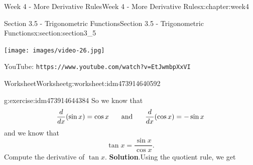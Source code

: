 \documentclass[oneside,10pt,]{book}
\newcommand{\blocktitlefont}{\relax}
\newcommand{\mono}[1]{\texttt{#1}}
\numberwithin{equation}{section}
\newlength{\qrsize}
\newlength{\previewwidth}
\begin{document}
\begin{chapterptx}{Week 4 - More Derivative Rules}{}{Week 4 - More Derivative Rules}{}{}{x:chapter:week4}
%
%
\typeout{************************************************}
\typeout{************************************************}
%
\begin{sectionptx}{Section 3.5 - Trigonometric Functions}{}{Section 3.5 - Trigonometric Functions}{}{}{x:section:section3_5}
\setlength{\qrsize}{9em}
\setlength{\previewwidth}{\linewidth}
\addtolength{\previewwidth}{-\qrsize}
\begin{tcbraster}[raster columns=2, raster column skip=1pt, raster halign=center, raster force size=false, raster left skip=0pt, raster right skip=0pt]%
\begin{tcolorbox}[previewstyle, width=\previewwidth]%
\texttt{[image: images/video-26.jpg]}%
\end{tcolorbox}%
\begin{tcolorbox}[qrstyle]%
{\hypersetup{urlcolor=black}}%
\end{tcolorbox}%
\begin{tcolorbox}[captionstyle]%
\small YouTube: \mono{https://www.youtube.com/watch?v=EtJwmbpXxVI}\end{tcolorbox}%
\end{tcbraster}%
%
%
\typeout{************************************************}
\typeout{************************************************}
%
\begin{worksheet-subsection}{Worksheet}{}{Worksheet}{}{}{g:worksheet:idm473914640592}
\begin{divisionexercise}{1}{}{}{g:exercise:idm473914644384}%
So we know that%
\begin{equation*}
\frac{d}{dx} ( \sin x ) = \cos x \hspace{.2in} \text{ and } \hspace{.2in} \frac{d}{dx} (\cos x) = - \sin x 
\end{equation*}
and we know that%
\begin{equation*}
\tan x = \frac{\sin x}{\cos x} . 
\end{equation*}
Compute the derivative of \(\tan x\).%
\textbf{\blocktitlefont Solution}.\hypertarget{g:solution:idm473914644064}{}\quad{}Using the quotient rule, we get%
\begin{equation*}

\end{equation*}
\end{divisionexercise}
\end{worksheet-subsection}
\end{sectionptx}
\end{chapterptx}
\end{document}
